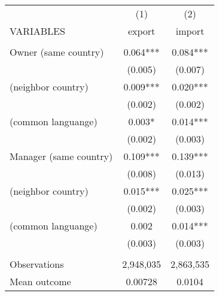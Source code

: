 \begin{tabular}{lcc} \hline
 & (1) & (2) \\
VARIABLES & export & import \\ \hline
 &  &  \\
Owner (same country) & 0.064*** & 0.084*** \\
 & (0.005) & (0.007) \\
(neighbor country) & 0.009*** & 0.020*** \\
 & (0.002) & (0.002) \\
(common languange) & 0.003* & 0.014*** \\
 & (0.002) & (0.003) \\
Manager (same country) & 0.109*** & 0.139*** \\
 & (0.008) & (0.013) \\
(neighbor country) & 0.015*** & 0.025*** \\
 & (0.002) & (0.003) \\
(common languange) & 0.002 & 0.014*** \\
 & (0.003) & (0.003) \\
 &  &  \\
Observations & 2,948,035 & 2,863,535 \\
 Mean outcome & 0.00728 & 0.0104 \\ \hline
\end{tabular}
